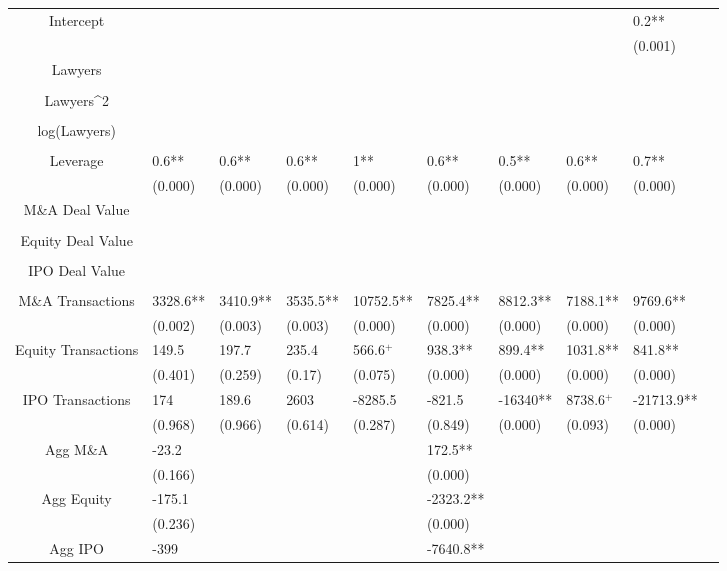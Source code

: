 \documentclass{article}
\begin{document}
\begin{table}[H]
\begin{tabular}{|clllllllll|}
Intercept &  &  &  &  &  &  &  & 0.2** & \\ 
   &  &  &  &  &  &  &  & (0.001) & \\ 
  Lawyers &  &  &  &  &  &  &  &  & \\ 
   &  &  &  &  &  &  &  &  & \\ 
  Lawyers^2 &  &  &  &  &  &  &  &  & \\ 
   &  &  &  &  &  &  &  &  & \\ 
  log(Lawyers) &  &  &  &  &  &  &  &  & \\ 
   &  &  &  &  &  &  &  &  & \\ 
  Leverage & 0.6** & 0.6** & 0.6** & 1** & 0.6** & 0.5** & 0.6** & 0.7** & \\ 
   & (0.000) & (0.000) & (0.000) & (0.000) & (0.000) & (0.000) & (0.000) & (0.000) & \\ 
  M\&A Deal Value &  &  &  &  &  &  &  &  & \\ 
   &  &  &  &  &  &  &  &  & \\ 
  Equity Deal Value &  &  &  &  &  &  &  &  & \\ 
   &  &  &  &  &  &  &  &  & \\ 
  IPO Deal Value &  &  &  &  &  &  &  &  & \\ 
   &  &  &  &  &  &  &  &  & \\ 
  M\&A Transactions & 3328.6** & 3410.9** & 3535.5** & 10752.5** & 7825.4** & 8812.3** & 7188.1** & 9769.6** & \\ 
   & (0.002) & (0.003) & (0.003) & (0.000) & (0.000) & (0.000) & (0.000) & (0.000) & \\ 
  Equity Transactions & 149.5 & 197.7 & 235.4 & 566.6$^{+}$ & 938.3** & 899.4** & 1031.8** & 841.8** & \\ 
   & (0.401) & (0.259) & (0.17) & (0.075) & (0.000) & (0.000) & (0.000) & (0.000) & \\ 
  IPO Transactions & 174 & 189.6 & 2603 & -8285.5 & -821.5 & -16340** & 8738.6$^{+}$ & -21713.9** & \\ 
   & (0.968) & (0.966) & (0.614) & (0.287) & (0.849) & (0.000) & (0.093) & (0.000) & \\ 
  Agg M\&A & -23.2 &  &  &  & 172.5** &  &  &  & \\ 
   & (0.166) &  &  &  & (0.000) &  &  &  & \\ 
  Agg Equity & -175.1 &  &  &  & -2323.2** &  &  &  & \\ 
   & (0.236) &  &  &  & (0.000) &  &  &  & \\ 
  Agg IPO & -399 &  &  &  & -7640.8** &  &  &  & \\ 

\end{tabular}
\end{table}
\end{document}
